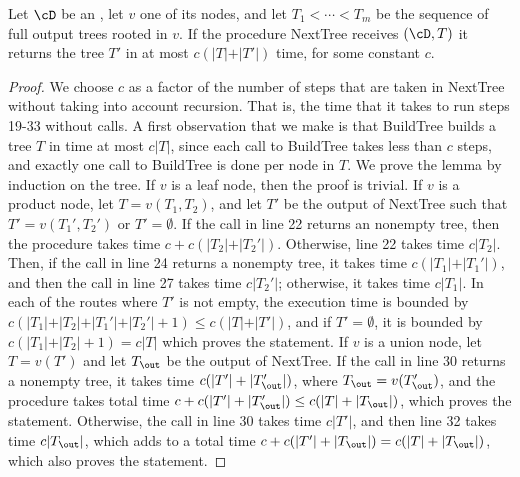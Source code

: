 \begin{lemma}\label{nested:appendix:next-tree-almost-linear-delay}
	Let $\cD$ be an \dsabbr, let $v$ one of its nodes, and let $T_1<\cdots<T_m$ be the sequence of full output trees rooted in $v$. If the procedure {\sc NextTree} receives $(\cD,T)$ it returns the tree $T'$ in at most $c(\vert T\vert + \vert T'\vert)$ time, for some constant $c$.
\end{lemma}
\begin{proof}
	We choose $c$ as a factor of the number of steps that are taken in {\sc NextTree} without taking into account recursion. That is, the time that it takes to run steps 19-33 without calls. A first observation that we make is that {\sc BuildTree} builds a tree $T$  in time at most $c\vert T\vert$, since each call to {\sc BuildTree} takes less than $c$ steps, and exactly one call to {\sc BuildTree} is done per node in $T$. We prove the lemma by induction on the tree. If $v$ is a leaf node, then the proof is trivial. If $v$ is a product node, let $T = v(T_1,T_2)$, and let $T'$ be the output of {\sc NextTree} such that $T' = v(T_1',T_2')$ or $T' = \emptyset$. If the call in line 22 returns an nonempty tree, then the procedure takes time $c + c(\vert T_2\vert + \vert T_2'\vert)$. Otherwise, line 22 takes time $c\vert T_2\vert$. Then, if the call in line 24 returns a nonempty tree, it takes time $c(\vert T_1\vert + \vert T_1'\vert)$, and then the call in line 27 takes time $c\vert T_2'\vert$; otherwise, it takes time $c\vert T_1\vert$. In each of the routes where $T'$ is not empty, the execution time is bounded by $c(\vert T_1\vert + \vert T_2\vert + \vert T_1'\vert + \vert T_2'\vert+1) \leq c(\vert T\vert + \vert T' \vert)$, and if $T' = \emptyset$, it is bounded by $c(\vert T_1\vert + \vert T_2\vert + 1) = c\vert T\vert$ which proves the statement. If $v$ is a union node, let $T = v(T')$ and let $T_{\out}$ be the output of {\sc NextTree}. If the call in line 30 returns a nonempty tree, it takes time $c(\vert T'\vert + \vert T_{\out}'\vert)$, where $T_{\out} = v(T_{\out}')$, and the procedure takes total time $c + c(\vert T'\vert + \vert T_{\out}'\vert)\leq c(\vert T\vert + \vert T_{\out}\vert)$, which proves the statement. Otherwise,  the call in line 30 takes time $c\vert T'\vert$, and then line 32 takes time $c\vert T_{\out}\vert$, which adds to a total time $c + c(\vert T'\vert + \vert T_{\out}\vert)= c(\vert T\vert + \vert T_{\out}\vert)$, which also proves the statement.
\end{proof}

